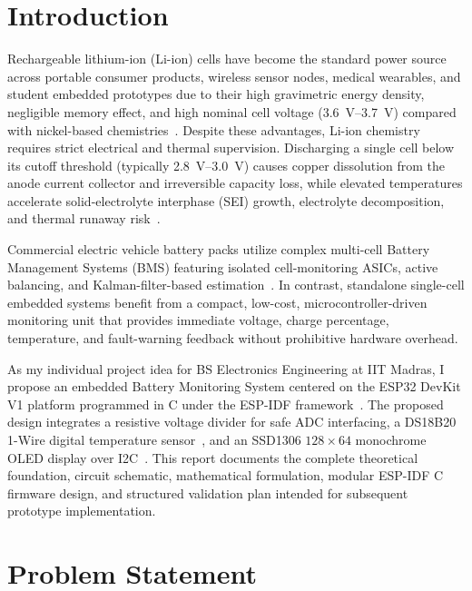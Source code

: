 \documentclass[12pt,a4paper]{article}
\begin{document}
\section{Introduction}
\label{sec:introduction}

Rechargeable lithium-ion (Li-ion) cells have become the standard power source across portable consumer products, wireless sensor nodes, medical wearables, and student embedded prototypes due to their high gravimetric energy density, negligible memory effect, and high nominal cell voltage (3.6~V--3.7~V) compared with nickel-based chemistries~\cite{reddy_linden}. Despite these advantages, Li-ion chemistry requires strict electrical and thermal supervision. Discharging a single cell below its cutoff threshold (typically 2.8~V--3.0~V) causes copper dissolution from the anode current collector and irreversible capacity loss, while elevated temperatures accelerate solid-electrolyte interphase (SEI) growth, electrolyte decomposition, and thermal runaway risk~\cite{plett_bms1}.

Commercial electric vehicle battery packs utilize complex multi-cell Battery Management Systems (BMS) featuring isolated cell-monitoring ASICs, active balancing, and Kalman-filter-based estimation~\cite{plett_bms2}. In contrast, standalone single-cell embedded systems benefit from a compact, low-cost, microcontroller-driven monitoring unit that provides immediate voltage, charge percentage, temperature, and fault-warning feedback without prohibitive hardware overhead.

As my individual project idea for BS Electronics Engineering at IIT Madras, I propose an embedded Battery Monitoring System centered on the ESP32 DevKit V1 platform programmed in C under the ESP-IDF framework~\cite{espressif_espidf}. The proposed design integrates a resistive voltage divider for safe ADC interfacing, a DS18B20 1-Wire digital temperature sensor~\cite{analog_ds18b20}, and an SSD1306 $128 \times 64$ monochrome OLED display over I2C~\cite{solomon_ssd1306}. This report documents the complete theoretical foundation, circuit schematic, mathematical formulation, modular ESP-IDF C firmware design, and structured validation plan intended for subsequent prototype implementation.

\section{Problem Statement}
\label{sec:problem_statement}
\end{document}
